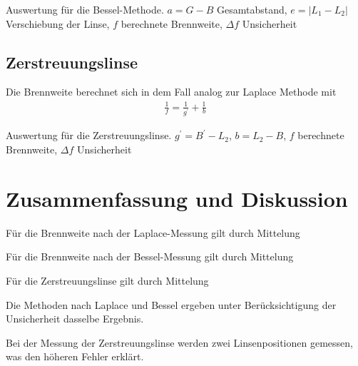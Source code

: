 \documentclass{article}
\begin{document}
\begin{table}[H]
\caption{Auswertung für die Bessel-Methode. $a = G-B$ Gesamtabstand, $e = |L_1-L_2|$ Verschiebung der Linse, $f$ berechnete Brennweite, $\Delta f$ Unsicherheit}
\label{tab:bessel_auswertung}
\centering

\end{table}


\subsection{Zerstreuungslinse}

Die Brennweite berechnet sich in dem Fall analog zur Laplace Methode mit
\begin{align}
\frac1f = \frac{1}{g^\prime} + \frac1b
\end{align}


\begin{table}[H]
\caption{Auswertung für die Zerstreuungslinse. $g^\prime = B^\prime - L_2$, $b = L_2 -B$, $f$ berechnete Brennweite, $\Delta f$ Unsicherheit}
\label{tab:zerstreuungslinse_auswertung}
\centering

\end{table}




\section{Zusammenfassung und Diskussion}

Für die Brennweite nach der Laplace-Messung gilt durch Mittelung 


Für die Brennweite nach der Bessel-Messung gilt durch Mittelung 


Für die Zerstreuungslinse gilt durch Mittelung 



Die Methoden nach Laplace und Bessel ergeben unter Berücksichtigung der Unsicherheit dasselbe Ergebnis.

Bei der Messung der Zerstreuungslinse werden zwei Linsenpositionen gemessen, was den höheren Fehler erklärt.
\end{document}
